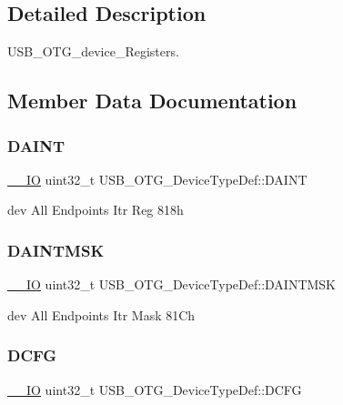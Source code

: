 \subsection{Detailed Description}
U\+S\+B\+\_\+\+O\+T\+G\+\_\+device\+\_\+\+Registers. 

\subsection{Member Data Documentation}
\mbox{\label{struct_u_s_b___o_t_g___device_type_def_a5d28aaa3ea2e4e2246f9ba7025c6a8e7}} 
\subsubsection{\texorpdfstring{DAINT}{DAINT}}
{\footnotesize\ttfamily \mbox{\hyperlink{core__sc300_8h_aec43007d9998a0a0e01faede4133d6be}{\+\_\+\+\_\+\+IO}} uint32\+\_\+t U\+S\+B\+\_\+\+O\+T\+G\+\_\+\+Device\+Type\+Def\+::\+D\+A\+I\+NT}

dev All Endpoints Itr Reg 818h \mbox{\label{struct_u_s_b___o_t_g___device_type_def_a26dc7ee19b8bd8c82378575cfddface4}} 
\subsubsection{\texorpdfstring{DAINTMSK}{DAINTMSK}}
{\footnotesize\ttfamily \mbox{\hyperlink{core__sc300_8h_aec43007d9998a0a0e01faede4133d6be}{\+\_\+\+\_\+\+IO}} uint32\+\_\+t U\+S\+B\+\_\+\+O\+T\+G\+\_\+\+Device\+Type\+Def\+::\+D\+A\+I\+N\+T\+M\+SK}

dev All Endpoints Itr Mask 81Ch \mbox{\label{struct_u_s_b___o_t_g___device_type_def_a9a9dac417f09f6a2d9a4b3110aa99b53}} 
\subsubsection{\texorpdfstring{DCFG}{DCFG}}
{\footnotesize\ttfamily \mbox{\hyperlink{core__sc300_8h_aec43007d9998a0a0e01faede4133d6be}{\+\_\+\+\_\+\+IO}} uint32\+\_\+t U\+S\+B\+\_\+\+O\+T\+G\+\_\+\+Device\+Type\+Def\+::\+D\+C\+FG}


